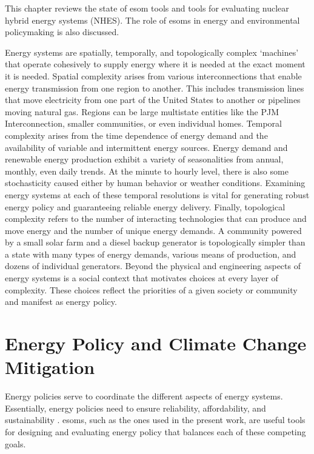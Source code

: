 This chapter reviews the state of \gls{esom} tools
and tools for evaluating nuclear hybrid energy systems (NHES). The role of \glspl{esom}
in energy and environmental policymaking is also discussed.

Energy systems are spatially, temporally, and topologically complex ‘machines’
that operate cohesively to supply energy where it is needed at the exact moment
it is needed. Spatial complexity arises from various interconnections that enable
energy transmission from one region to another. This includes transmission
lines that move electricity from one part of the United States to another or
pipelines moving natural gas. Regions can be large multistate entities like the
PJM Interconnection, smaller communities, or even individual homes. Temporal
complexity arises from the time dependence of energy demand and the availability of
variable and intermittent energy sources. Energy demand and renewable energy
production
exhibit a variety of seasonalities from annual, monthly, even daily trends.
At the minute to hourly level, there is also some stochasticity caused either by
human behavior or weather conditions.
Examining energy systems at each of these temporal resolutions is vital for
generating robust energy policy and guaranteeing reliable energy delivery. Finally,
topological complexity refers to the number of interacting technologies that can
produce and move energy and the number of unique energy demands.
A community powered by a small solar farm and a diesel
backup generator is topologically simpler than a state with many types of energy
demands, various means of production, and dozens of individual generators. Beyond
the physical and engineering aspects of energy systems is a social context that
motivates choices at every layer of complexity. These choices reflect the priorities
of a given society or community and manifest as energy policy.

\section{Energy Policy and Climate Change Mitigation}
\label{section:energy_policy}

Energy policies serve to coordinate the different aspects of energy systems.
Essentially, energy policies need to ensure reliability, affordability, and
sustainability \cite{fattahi_systemic_2020}. \glspl{esom}, such as the ones used
in the present work, are useful tools for designing and evaluating energy policy
that balances each of these competing goals.

